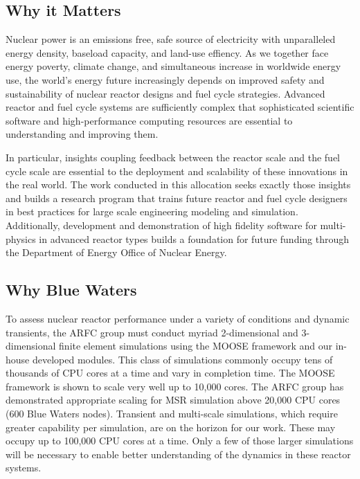 \documentclass[letterpaper]{article}
\begin{document}
\subsection{Why it Matters} 


Nuclear power is an emissions free, safe source of electricity with
unparalleled energy density, baseload capacity, and land-use effiency. 
As we together face energy poverty, climate change, and simultaneous increase
in worldwide energy use, the world's energy future increasingly depends on
improved safety and sustainability of nuclear reactor designs and fuel cycle
strategies. Advanced reactor and fuel cycle systems are sufficiently complex
that sophisticated scientific software and high-performance computing resources
are essential to understanding and improving them.

In particular, insights coupling feedback between the reactor scale and the
fuel cycle scale are essential to the deployment and scalability of these
innovations in the real world. The work conducted in this allocation seeks
exactly those insights and builds a research program that trains future
reactor and fuel cycle designers in best practices for large scale engineering 
modeling and simulation. Additionally, development and demonstration
of high fidelity software for multi-physics in advanced reactor types builds a
foundation for future funding through the Department of Energy Office of
Nuclear Energy. 

\subsection{Why Blue Waters} To assess nuclear reactor performance under a
variety of conditions and dynamic transients, the ARFC group must conduct
myriad 2-dimensional and 3-dimensional finite element simulations using the
MOOSE framework and our in-house developed modules. This class of simulations commonly
occupy tens of thousands of CPU cores at a time and vary in completion time.
The MOOSE framework is shown to scale very well up to 10,000 cores. The ARFC
group has demonstrated appropriate scaling for MSR simulation above 20,000 CPU
cores (600 Blue Waters nodes). Transient and multi-scale simulations, which
require greater capability per simulation, are on the horizon for our work.
These may occupy up to 100,000 CPU cores at a time. Only a few of those larger
simulations will be necessary to enable better understanding of the dynamics in
these reactor systems.
\end{document}
